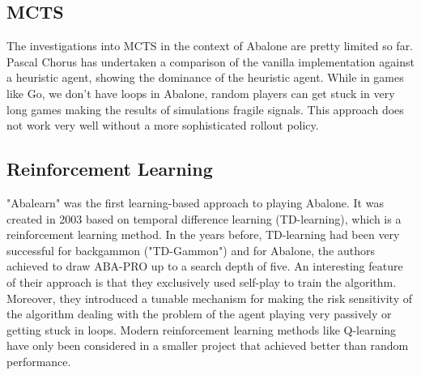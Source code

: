 \subsection{MCTS}
The investigations into MCTS in the context of Abalone are pretty limited so far. Pascal Chorus has undertaken a comparison of the vanilla implementation against a heuristic agent, showing the dominance of the heuristic agent. \cite{chorus_implementing_2009} While in games like Go, we don't have loops in Abalone, random players can get stuck in very long games making the results of simulations fragile signals. This approach does not work very well without a more sophisticated rollout policy.

\subsection{Reinforcement Learning}
"Abalearn" was the first learning-based approach to playing Abalone. \cite{campos_abalearn_2003} It was created in 2003 based on temporal difference learning (TD-learning), which is a reinforcement learning method. In the years before, TD-learning had been very successful for backgammon ("TD-Gammon") \cite{tesauro_td-gammon_1994} and for Abalone, the authors achieved to draw ABA-PRO up to a search depth of five. An interesting feature of their approach is that they exclusively used self-play to train the algorithm. Moreover, they introduced a tunable mechanism for making the risk sensitivity of the algorithm dealing with the problem of the agent playing very passively or getting stuck in loops. Modern reinforcement learning methods like Q-learning have only been considered in a smaller project that achieved better than random performance. \cite{mizrachi_introduction_2017}
